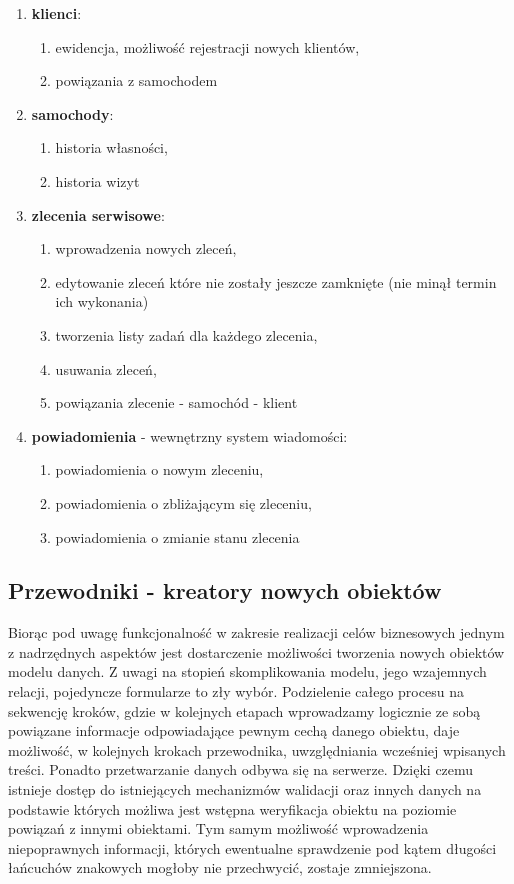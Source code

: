 			\begin{enumerate}
				\item \textbf{klienci}:
				\begin{enumerate}
					\item ewidencja, możliwość rejestracji nowych klientów,
					\item powiązania z samochodem
				\end{enumerate}
				\item \textbf{samochody}:
				\begin{enumerate}
					\item historia własności,
					\item historia wizyt
				\end{enumerate}
				\item \textbf{zlecenia serwisowe}:
				\begin{enumerate}
					\item wprowadzenia nowych zleceń,
					\item edytowanie zleceń które nie zostały jeszcze zamknięte (nie minął termin ich wykonania)
					\item tworzenia listy zadań dla każdego zlecenia,
					\item usuwania zleceń,
					\item powiązania zlecenie - samochód - klient
				\end{enumerate}
				\item \textbf{powiadomienia} - wewnętrzny system wiadomości:
				\begin{enumerate}
					\item powiadomienia o nowym zleceniu,
					\item powiadomienia o zbliżającym się zleceniu,
					\item powiadomienia o zmianie stanu zlecenia
				\end{enumerate}
			\end{enumerate}
			
		\subsection{Przewodniki - kreatory nowych obiektów}
			Biorąc pod uwagę funkcjonalność w zakresie realizacji celów biznesowych jednym z nadrzędnych aspektów jest dostarczenie możliwości tworzenia nowych obiektów modelu danych. Z uwagi na stopień skomplikowania modelu, jego wzajemnych relacji, pojedyncze formularze to zły wybór. Podzielenie całego procesu na sekwencję kroków, gdzie w kolejnych etapach wprowadzamy logicznie ze sobą powiązane informacje odpowiadające pewnym cechą danego obiektu, daje możliwość, w kolejnych krokach przewodnika, uwzględniania wcześniej wpisanych treści. Ponadto przetwarzanie danych odbywa się na serwerze. Dzięki czemu istnieje dostęp do istniejących mechanizmów walidacji oraz innych danych na podstawie których możliwa jest wstępna weryfikacja obiektu na poziomie powiązań z innymi obiektami. Tym samym możliwość wprowadzenia niepoprawnych informacji, których ewentualne sprawdzenie pod kątem długości łańcuchów znakowych mogłoby nie przechwycić, zostaje zmniejszona.
